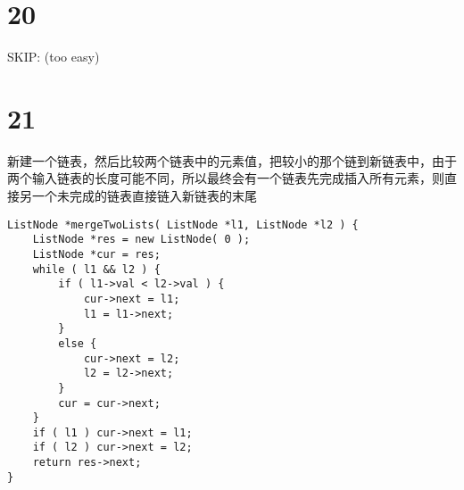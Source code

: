 \documentclass[12pt,a4paper]{article}
\begin{document}
\section{20}
SKIP: (too easy)

\section{21}
\begin{CJK}{UTF8}{gbsn}
新建一个链表，然后比较两个链表中的元素值，把较小的那个链到新链表中，由于两个输入链表的长度可能不同，所以最终会有一个链表先完成插入所有元素，则直接另一个未完成的链表直接链入新链表的末尾
\end{CJK}
\begin{lstlisting}
ListNode *mergeTwoLists( ListNode *l1, ListNode *l2 ) {
	ListNode *res = new ListNode( 0 );
	ListNode *cur = res;
	while ( l1 && l2 ) {
		if ( l1->val < l2->val ) {
			cur->next = l1;
			l1 = l1->next;
		}
		else {
			cur->next = l2;
			l2 = l2->next;
		}
		cur = cur->next;
	}
	if ( l1 ) cur->next = l1;
	if ( l2 ) cur->next = l2;
	return res->next;
}
\end{lstlisting}
\end{document}
